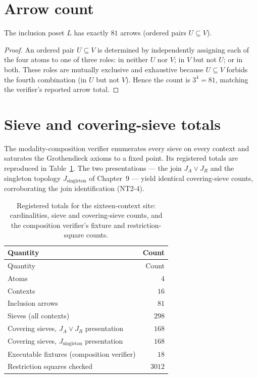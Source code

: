 \section{Arrow count}\label{appB:arrows}

\begin{proposition}\label{appB:arrowcount}
The inclusion poset $L$ has exactly $81$ arrows (ordered pairs $U\subseteq V$).
\end{proposition}

\begin{proof}
An ordered pair $U\subseteq V$ is determined by independently assigning each of
the four atoms to one of three roles: in neither $U$ nor $V$; in $V$ but not
$U$; or in both. These roles are mutually exclusive and exhaustive because
$U\subseteq V$ forbids the fourth combination (in $U$ but not $V$). Hence the
count is $3^4=81$, matching the verifier's reported arrow total.
\end{proof}

\section{Sieve and covering-sieve totals}\label{appB:sieves}

The modality-composition verifier enumerates every sieve on every context and
saturates the Grothendieck axioms to a fixed point. Its registered totals are
reproduced in Table~\ref{appB:sievetotals}. The two presentations --- the join
$J_A\vee J_R$ and the singleton topology $J_{\mathrm{singleton}}$ of
Chapter~9 --- yield identical covering-sieve counts, corroborating the join
identification (NT2-4).

\begin{longtable}{@{}lr@{}}
\caption{Registered totals for the sixteen-context site: cardinalities,
sieve and covering-sieve counts, and the composition verifier's fixture
and restriction-square counts.}\label{appB:sievetotals}\\
\toprule
Quantity & Count \\
\midrule
\endfirsthead
\toprule
Quantity & Count \\
\midrule
\endhead
\bottomrule
\endfoot
Atoms & $4$ \\
Contexts & $16$ \\
Inclusion arrows & $81$ \\
Sieves (all contexts) & $298$ \\
Covering sieves, $J_A\vee J_R$ presentation & $168$ \\
Covering sieves, $J_{\mathrm{singleton}}$ presentation & $168$ \\
Executable fixtures (composition verifier) & $18$ \\
Restriction squares checked & $3012$ \\
\bottomrule
\end{longtable}

